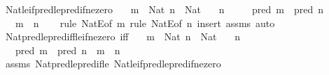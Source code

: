 \begin{isabellebody}
\endisatagproof
{\isafoldproof}%
%
\isadelimproof
\isanewline
%
\endisadelimproof
\isanewline
{}\isamarkupfalse%
\ Nat{\isacharunderscore}{\kern0pt}le{\isacharunderscore}{\kern0pt}if{\isacharunderscore}{\kern0pt}pred{\isacharunderscore}{\kern0pt}le{\isacharunderscore}{\kern0pt}pred{\isacharunderscore}{\kern0pt}if{\isacharunderscore}{\kern0pt}ne{\isacharunderscore}{\kern0pt}zero{\isacharcolon}{\kern0pt}\isanewline
\ \ \ {\isachardoublequoteopen}m\ {\isacharcolon}{\kern0pt}\ Nat{\isachardoublequoteclose}\ {\isachardoublequoteopen}n\ {\isacharcolon}{\kern0pt}\ Nat{\isachardoublequoteclose}\isanewline
\ \ \ {\isachardoublequoteopen}n\ {\isasymnoteq}\ {}{\isachardoublequoteclose}\isanewline
\ \ \ {\isachardoublequoteopen}pred\ m\ {\isasymle}\ pred\ n{\isachardoublequoteclose}\isanewline
\ \ \ {\isachardoublequoteopen}m\ {\isasymle}\ n{\isachardoublequoteclose}\isanewline
%
\isadelimproof
\ \ %
\endisadelimproof
%
\isatagproof
{}\isamarkupfalse%
\ {\isacharparenleft}{\kern0pt}rule\ NatE{\isacharbrackleft}{\kern0pt}of\ m{\isacharbrackright}{\kern0pt}{\isacharsemicolon}{\kern0pt}\ rule\ NatE{\isacharbrackleft}{\kern0pt}of\ n{\isacharbrackright}{\kern0pt}{\isacharparenright}{\kern0pt}\ {\isacharparenleft}{\kern0pt}insert\ assms{\isacharcomma}{\kern0pt}\ auto{\isacharparenright}{\kern0pt}%
\endisatagproof
{\isafoldproof}%
%
\isadelimproof
\isanewline
%
\endisadelimproof
\isanewline
{}\isamarkupfalse%
\ Nat{\isacharunderscore}{\kern0pt}pred{\isacharunderscore}{\kern0pt}le{\isacharunderscore}{\kern0pt}pred{\isacharunderscore}{\kern0pt}iff{\isacharunderscore}{\kern0pt}le{\isacharunderscore}{\kern0pt}if{\isacharunderscore}{\kern0pt}ne{\isacharunderscore}{\kern0pt}zero\ {\isacharbrackleft}{\kern0pt}iff{\isacharbrackright}{\kern0pt}{\isacharcolon}{\kern0pt}\isanewline
\ \ \ {\isachardoublequoteopen}m\ {\isacharcolon}{\kern0pt}\ Nat{\isachardoublequoteclose}\ {\isachardoublequoteopen}n\ {\isacharcolon}{\kern0pt}\ Nat{\isachardoublequoteclose}\isanewline
\ \ \ {\isachardoublequoteopen}n\ {\isasymnoteq}\ {}{\isachardoublequoteclose}\isanewline
\ \ \ {\isachardoublequoteopen}pred\ m\ {\isasymle}\ pred\ n\ {\isasymlongleftrightarrow}\ m\ {\isasymle}\ n{\isachardoublequoteclose}\isanewline
%
\isadelimproof
\ \ %
\endisadelimproof
%
\isatagproof
{}\isamarkupfalse%
\ assms\ Nat{\isacharunderscore}{\kern0pt}pred{\isacharunderscore}{\kern0pt}le{\isacharunderscore}{\kern0pt}pred{\isacharunderscore}{\kern0pt}if{\isacharunderscore}{\kern0pt}le\ Nat{\isacharunderscore}{\kern0pt}le{\isacharunderscore}{\kern0pt}if{\isacharunderscore}{\kern0pt}pred{\isacharunderscore}{\kern0pt}le{\isacharunderscore}{\kern0pt}pred{\isacharunderscore}{\kern0pt}if{\isacharunderscore}{\kern0pt}ne{\isacharunderscore}{\kern0pt}zero\ \isamarkupfalse%

\end{isabellebody}
